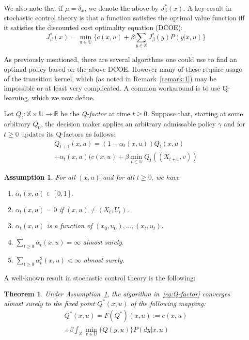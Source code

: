 \documentclass[conference]{IEEEtran}
\newtheorem{theorem}{Theorem}[section]
\newtheorem{assumption}{Assumption}[section]
\begin{document}
We also note that if \(\mu = \delta_x\), we denote the above by \(J_\beta^*(x)\). A key result in stochastic control theory is that a function satisfies the optimal value function iff it satisfies the discounted cost optimality equation (DCOE):
\begin{equation} J_\beta^*(x) = \min_{u\in\mathbb{U}}\biggl\{ c(x,u) + \beta\sum_{y \in \mathbb{X}}J^*_\beta(y)P(y | x,u) \biggl\}\label{eq:DCOE} \end{equation}

As previously mentioned, there are several algorithms one could use to find an optimal policy based on the above DCOE. However many of these require usage of the transition kernel, which (as noted in Remark~\ref{remark:1}) may be impossible or at least very complicated. A common workaround is to use Q-learning, which we now define.

Let \(Q_t : \mathbb{X} \times \mathbb{U} \to \mathbb{R} \) be the \emph{Q-factor} at time \(t\ge0\). Suppose that, starting at some arbitrary \(Q_0\), the decision maker applies an arbitrary admissable policy \(\gamma\) and for \(t\ge0\) updates its Q-factors as follows:
\begin{multline}
    Q_{t+1}(x,u) = (1- \alpha_t(x,u))Q_t(x,u) \\ + \alpha_t(x,u)(c(x,u)+\beta \; \underset{v\in\mathbb{U}}{\text{min}} \; Q_t((X_{t+1},v))\label{eq:Q-factor}
\end{multline}

\begin{assumption}\label{assumption:alpha}
    For all \((x,u)\) and for all \(t\ge0\), we have
    \begin{enumerate}
        \item \(\alpha_t(x,u) \in [0,1]\).
        \item \(\alpha_t(x,u) = 0 \) if \((x,u) \neq (X_t,U_t)\).
        \item \(\alpha_t(x,u) \) is a function of \((x_0,u_0),\ldots,(x_t,u_t)\).
        \item \(\sum_{t\ge0}\alpha_t(x,u) = \infty\) almost surely.
        \item \(\sum_{t\ge0}\alpha_t^2(x,u) < \infty\) almost surely.
    \end{enumerate}
\end{assumption}

A well-known result in stochastic control theory is the following:
\begin{theorem}
    Under Assumption~\ref{assumption:alpha}, the algorithm in~\eqref{eq:Q-factor} converges almost surely to the fixed point \(Q^*(x,u)\) of the following mapping:
    \begin{multline*} Q^*(x,u) = F(Q^*)(x,u) := c(x,u) \\ + \beta\int_\mathbb{X}\min_{v\in\mathbb{U}}\bigl\{Q(y,u)\bigl\}P(dy | x,u)\end{multline*}
\end{theorem}
\end{document}
